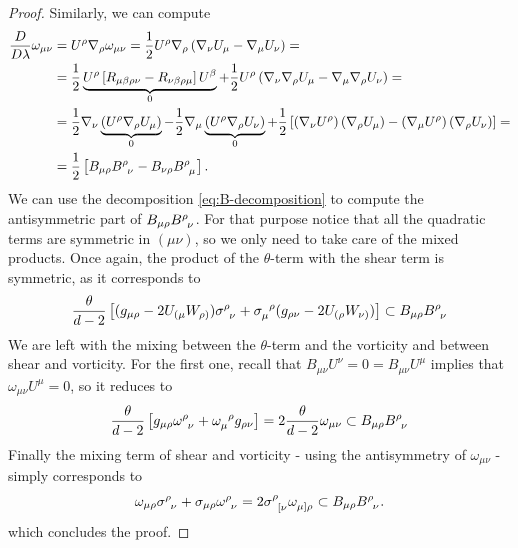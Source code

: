 \begin{proof}
		Similarly, we can compute
		\small{
		\begin{align*}
			\frac{D}{D\lambda}\omega_{\mu\nu} &= U^{\rho}\nabla_{\rho}\omega_{\mu\nu} = \frac{1}{2}U^{\rho}\nabla_{\rho}\left( \nabla_{\nu}U_{\mu} - \nabla_{\mu}U_{\nu} \right) = \\
		&= \frac{1}{2}\underbrace{U^{\rho} \left[R_{\mu\beta\rho\nu} - R_{\nu\beta\rho\mu}\right]U^{\beta}}_{0} + \frac{1}{2}U^{\rho}\left(\nabla_{\nu}\nabla_{\rho}U_{\mu} - \nabla_{\mu}\nabla_{\rho}U_{\nu}\right) = \\
		&= \frac{1}{2} \nabla_{\nu}\underbrace{\left( U^{\rho} \nabla_{\rho}U_{\mu}\right)}_{0} -  \frac{1}{2} \nabla_{\mu}\underbrace{\left( U^{\rho} \nabla_{\rho}U_{\nu}\right)}_{0} + \frac{1}{2}\left[\left(\nabla_{\nu}U^{\rho}\right)\left(\nabla_{\rho}U_{\mu}\right) - \left(\nabla_{\mu}U^{\rho}\right)\left(\nabla_{\rho}U_{\nu}\right) \right] =\\
		&= \frac{1}{2} \left[B_{\mu\rho}B\indices{^{\rho}_{\nu}} - B_{\nu\rho}B\indices{^{\rho}_{\mu}} \right].
		\end{align*}
		}
		We can use the decomposition \ref{eq:B-decomposition} to compute the antisymmetric part of \(B_{\mu\rho}B\indices{^{\rho}_{\nu}}\). For that purpose notice that all the quadratic terms are symmetric in \((\mu\nu)\), so we only need to take care of the mixed products. Once again, the product of the \(\theta\)-term with the shear term is symmetric, as it corresponds to
		\[
		\frac{\theta}{d - 2}\left[(g_{\mu\rho} - 2U_{(\mu}W_{\rho)}) \sigma\indices{^{\rho}_{\nu}} + \sigma\indices{_{\mu}^{\rho}}(g_{\rho\nu} - 2U_{(\rho}W_{\nu)})\right] \subset B_{\mu\rho}B\indices{^{\rho}_{\nu}}
		\]
		We are left with the mixing between the \(\theta\)-term and the vorticity and between shear and vorticity. For the first one, recall that \(B_{\mu\nu}U^{\nu} = 0 = B_{\mu\nu}U^{\mu}\) implies that \(\omega_{\mu\nu}U^{\mu} = 0\), so it reduces to
		\[
		\frac{\theta}{d - 2}\left[g_{\mu\rho}\omega\indices{^{\rho}_{\nu}} + \omega\indices{_{\mu}^{\rho}}g_{\rho\nu}\right] = 2 \frac{\theta}{d -2}\omega_{\mu\nu} \subset B_{\mu\rho}B\indices{^{\rho}_{\nu}}
		\]
		Finally the mixing term of shear and vorticity - using the antisymmetry of \(\omega_{\mu\nu}\) - simply corresponds to 
		\[
		\omega_{\mu\rho} \sigma\indices{^{\rho}_{\nu}} + \sigma_{\mu\rho} \omega\indices{^{\rho}_{\nu}} = 2 \sigma\indices{^{\rho}_{[\nu}}\omega\indices{_{\mu]\rho}} \subset B_{\mu\rho}B\indices{^{\rho}_{\nu}}.
		\]
		which concludes the proof.
	\end{proof}
	
